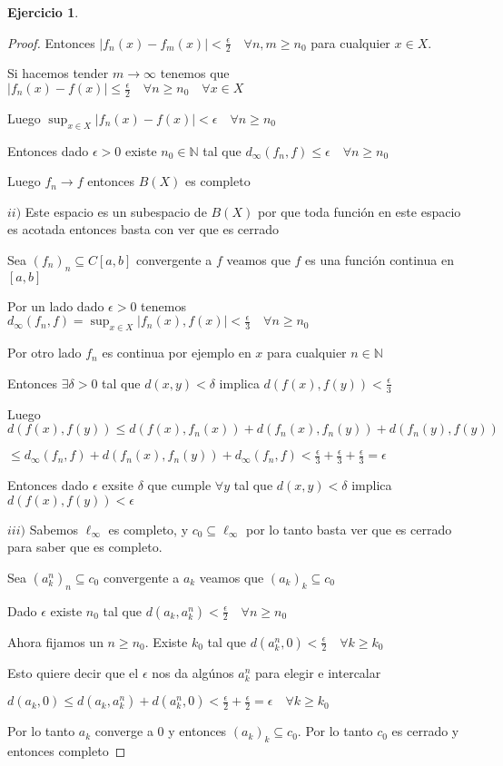 \documentclass[12pt]{article}
\newcommand{\N}{\mathbb{N}}
\newcommand{\ra}{\rightarrow}
\theoremstyle{definition}
\newtheorem{ej}{Ejercicio}
\begin{document}
\begin{ej}
\begin{proof}
	  Entonces $|f_n(x) - f_m(x)| < \frac{\epsilon}{2} \quad \forall n,m \geq n_0$ para cualquier $x \in X$.

	  Si hacemos tender $m \ra \infty$ tenemos que $|f_n(x) - f(x)| \leq \frac{\epsilon}{2} \quad \forall n \geq n_0 \quad \forall x \in X$

	  Luego $\sup_{x \in X} |f_n(x) - f(x)| < \epsilon \quad \forall n\geq n_0$ 

	  Entonces dado $\epsilon > 0$ existe $n_0 \in \N$ tal que $d_{\infty}(f_n,f) \leq \epsilon \quad \forall n \geq n_0$

	  Luego $f_n \ra f$ entonces $B(X)$ es completo

	  $ii)$ Este espacio es un subespacio de $B(X)$ por que toda función en este espacio es acotada entonces basta con ver que es cerrado

	  Sea $(f_n)_n \subseteq C[a,b]$ convergente a $f$ veamos que $f$ es una función continua en $[a,b]$

	  Por un lado dado $\epsilon > 0 $ tenemos $d_{\infty}(f_n,f) = \sup_{x \in X} |f_n(x),f(x)| < \frac{\epsilon}{3} \quad \forall n \geq n_0 $

	  Por otro lado $f_n$ es continua por ejemplo en $x$ para cualquier $n \in \N$ 

	  Entonces $\exists \delta > 0 $ tal que $d(x,y) < \delta$ implica $d(f(x),f(y)) < \frac{\epsilon}{3}$

	  Luego $d(f(x),f(y)) \leq d(f(x),f_n(x)) + d(f_n(x),f_n(y)) + d(f_n(y),f(y)) $

	  $\leq d_{\infty}(f_n,f) + d(f_n(x),f_n(y)) + d_{\infty}(f_n,f) < \frac{\epsilon}{3}  + \frac{\epsilon}{3} + \frac{\epsilon}{3} = \epsilon$

	  Entonces dado $\epsilon$ exsite $\delta$ que cumple $\forall y$ tal que $d(x,y) < \delta$ implica $d(f(x),f(y)) < \epsilon \quad$

	  


   $ iii)$ Sabemos $\ell_{\infty}$ es completo, y $c_0 \subseteq \ell_{\infty}$ por lo tanto basta ver que es cerrado para saber que es completo.

  Sea $(a_k^n)_n \subseteq c_0$ convergente a $a_k$ veamos que $(a_k)_k \subseteq c_0$ 

  Dado $\epsilon$ existe $n_0$ tal que $d(a_k,a_k^n) < \frac{\epsilon}{2} \quad \forall n \geq n_0$

  Ahora fijamos un $n \geq n_0$. Existe $k_0$ tal que $d(a_k^n,0) < \frac{\epsilon}{2} \quad \forall k \geq k_0$

  Esto quiere decir que el $\epsilon$ nos da algúnos $a_k^n$ para elegir e intercalar

  $d(a_k,0) \leq d(a_k,a_k^n) + d(a_k^n,0) < \frac{\epsilon}{2} + \frac{\epsilon}{2} = \epsilon \quad \forall k \geq k_0$

  Por lo tanto $a_k$ converge a 0 y entonces $(a_k)_k \subseteq c_0$. Por lo tanto $c_0$ es cerrado y entonces completo
  \end{proof}
\end{ej}
\end{document}

